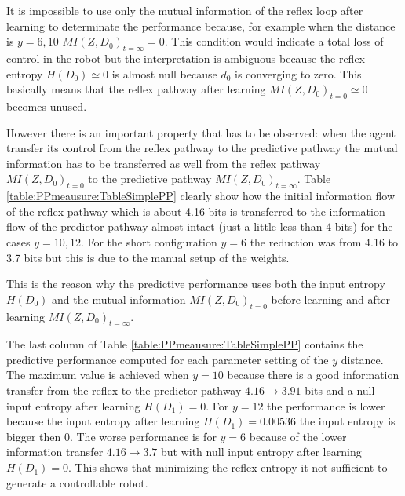 It is impossible to use only the mutual information of the reflex loop after learning
to determinate the performance because, for example when the distance is $y=6,10$
$MI(Z,D_0)_{t=\infty}=0$. This condition would indicate a total loss of control
in the robot but the interpretation is ambiguous because the reflex entropy $H(D_0)\simeq 0$
is almost null because $d_0$ is converging to zero. This basically means that 
the reflex pathway after learning $MI(Z,D_0)_{t=0} \simeq 0$ becomes unused.

However there is an important property that has to be observed: when the agent
transfer its control from the reflex pathway to the predictive pathway the mutual information
has to be transferred as well from the reflex pathway $MI(Z,D_0)_{t=0}$ to the
predictive pathway $MI(Z,D_0)_{t=\infty}$.
Table \ref{table:PPmeausure:TableSimplePP} clearly show how the initial information flow
of the reflex pathway which is about 4.16 bits is transferred to the information flow
of the predictor pathway almost intact (just a little less than 4 bits) for the cases
$y=10,12$. For the short configuration $y=6$ the reduction was from 4.16 to 3.7 bits
but this is due to the manual setup of the weights.

This is the reason why the predictive performance uses both the input entropy 
$H(D_{0})$ and the mutual information $MI(Z,D_0)_{t=0}$ before learning and
after learning $MI(Z,D_0)_{t=\infty}$.

The last column of Table \ref{table:PPmeausure:TableSimplePP} contains the predictive
performance computed for each parameter setting of the $y$ distance.
The maximum value is achieved when $y=10$ because there is a good information transfer
from the reflex to the predictor pathway $4.16 \rightarrow 3.91 $ bits and a null
input entropy after learning $H(D_1)=0$.
For $y=12$ the performance is lower because the input entropy after learning
$H(D_1)=0.00536$ the input entropy is bigger then 0.
The worse performance is for $y=6$ because of the lower information transfer
$4.16 \rightarrow 3.7 $ but with null input entropy after learning $H(D_1)=0$.
This shows that minimizing the reflex entropy it not sufficient to generate a
controllable robot.

